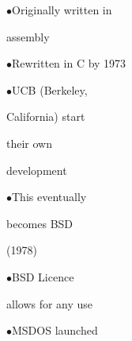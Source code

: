 \documentclass[a4paper,portrait,12pt]{article}
\begin{document}
\begin{flushleft}
$\bullet$Originally written in
\end{flushleft}


\begin{flushleft}
assembly
\end{flushleft}


\begin{flushleft}
$\bullet$Rewritten in C by 1973
\end{flushleft}







\begin{flushleft}
$\bullet$UCB (Berkeley,
\end{flushleft}


\begin{flushleft}
California) start
\end{flushleft}


\begin{flushleft}
their own
\end{flushleft}


\begin{flushleft}
development
\end{flushleft}


\begin{flushleft}
$\bullet$This eventually
\end{flushleft}


\begin{flushleft}
becomes BSD
\end{flushleft}


(1978)


\begin{flushleft}
$\bullet$BSD Licence
\end{flushleft}


\begin{flushleft}
allows for any use
\end{flushleft}







\begin{flushleft}
$\bullet$MSDOS launched
\end{flushleft}





\end{document}
